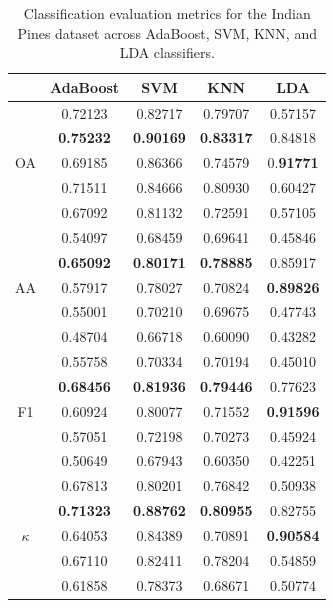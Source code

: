 \documentclass[12pt,onecolumn]{article}
\begin{document}
\begin{table}[h!]
\centering
\begin{tabular}{ccccc}
\hline
& AdaBoost & SVM & KNN & LDA \\
\hline

\multirow{5}{*}{OA}
& 0.72123 & 0.82717 & 0.79707 & 0.57157 \\
& \textbf{0.75232} & \textbf{0.90169} & \textbf{0.83317} & 0.84818 \\
& 0.69185 & 0.86366 & 0.74579 & 0.\textbf{91771} \\
& 0.71511 & 0.84666 & 0.80930 & 0.60427 \\
& 0.67092 & 0.81132 & 0.72591 & 0.57105 \\
\hline

\multirow{5}{*}{AA}
& 0.54097 & 0.68459 & 0.69641 & 0.45846 \\
& \textbf{0.65092} & \textbf{0.80171} & \textbf{0.78885} & 0.85917 \\
& 0.57917 & 0.78027 & 0.70824 & \textbf{0.89826} \\
& 0.55001 & 0.70210 & 0.69675 & 0.47743 \\
& 0.48704 & 0.66718 & 0.60090 & 0.43282 \\
\hline

\multirow{5}{*}{F1}
& 0.55758 & 0.70334 & 0.70194 & 0.45010 \\
& \textbf{0.68456} & \textbf{0.81936} & \textbf{0.79446} & 0.77623 \\
& 0.60924 & 0.80077 & 0.71552 & \textbf{0.91596} \\
& 0.57051 & 0.72198 & 0.70273 & 0.45924 \\
& 0.50649 & 0.67943 & 0.60350 & 0.42251 \\
\hline

\multirow{5}{*}{$\kappa$}
& 0.67813 & 0.80201 & 0.76842 & 0.50938 \\
& \textbf{0.71323} & \textbf{0.88762} & \textbf{0.80955} & 0.82755 \\
& 0.64053 & 0.84389 & 0.70891 & \textbf{0.90584} \\
& 0.67110 & 0.82411 & 0.78204 & 0.54859 \\
& 0.61858 & 0.78373 & 0.68671 & 0.50774 \\
\hline
\end{tabular}
\caption{Classification evaluation metrics for the Indian Pines dataset across AdaBoost, SVM, KNN, and LDA classifiers.}
\label{tab:indian}
\end{table}
\end{document}
